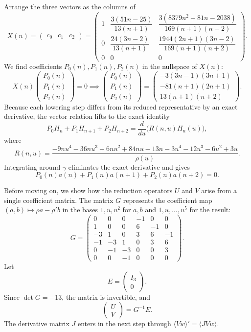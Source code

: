 \documentclass[11pt,fleqn]{article}
\theoremstyle{plain}
\newcommand{\poly}[1]{\langle #1\rangle}
\begin{document}
	Arrange the three vectors as the columns of
	\[
	X(n)=
	\begin{pmatrix}
		c_0&c_1&c_2
	\end{pmatrix}
	=
	\begin{pmatrix}
		1&
		\dfrac{3(51n-25)}{13(n+1)}&
		\dfrac{3(8379n^2+81n-2038)}
		{169(n+1)(n+2)}
		\\[6pt]
		0&
		\dfrac{24(3n-2)}{13(n+1)}&
		\dfrac{1944(2n+1)(3n-2)}
		{169(n+1)(n+2)}
		\\[6pt]
		0&0&0
	\end{pmatrix}.
	\]
	We find coefficients $P_0(n),P_1(n),P_2(n)$ in the nullspace of $X(n)$:
	\[
	X(n)
	\begin{pmatrix}
		P_0(n)\\P_1(n)\\P_2(n)
	\end{pmatrix}
	=0 \implies
	\begin{pmatrix}
		P_0(n)\\P_1(n)\\P_2(n)
	\end{pmatrix}
	=
	\begin{pmatrix}
		-3(3n-1)(3n+1)\\
		-81(n+1)(2n+1)\\
		13(n+1)(n+2)
	\end{pmatrix}.
	\]
	Because each lowering step differs from its reduced representative by
	an exact derivative, the vector relation lifts to the exact identity
	\[
	P_0H_n+P_1H_{n+1}+P_2H_{n+2}
	=
	\frac{d}{du}\bigl(R(n,u)H_n(u)\bigr),
	\]
	where
	\[
	R(n,u)=
	\frac{-9nu^4-36nu^3+6nu^2+84nu-13n
		-3u^4-12u^3-6u^2+3u}{\rho(u)}.
	\]
	Integrating around $\gamma$ eliminates the exact derivative and gives
	\[
	P_0(n)a(n)+P_1(n)a(n+1)+P_2(n)a(n+2)=0.
	\]
	
	Before moving on, we show how the reduction operators $U$ and $V$ arise from a
	single coefficient matrix. The matrix $G$ represents the coefficient map
	$(a,b)\mapsto\rho a-\rho'b$ in the bases $1,u,u^2$ for $a,b$ and
	$1,u,\ldots,u^5$ for the result:
	\[
	G=
	\begin{pmatrix}
		0&0&0&-1&0&0\\
		1&0&0&6&-1&0\\
		-3&1&0&3&6&-1\\
		-1&-3&1&0&3&6\\
		0&-1&-3&0&0&3\\
		0&0&-1&0&0&0
	\end{pmatrix}.
	\]
	Let
	\[
	E=\begin{pmatrix}I_3\\0\end{pmatrix}.
	\]
	Since $\det G=-13$, the matrix is invertible, and
	\[
	\begin{pmatrix}
		U\\V
	\end{pmatrix}
	=G^{-1}E.
	\]
	The derivative matrix $J$ enters in the next step
	through $\poly{Vw}'=\poly{JVw}$.
	
\end{document}
